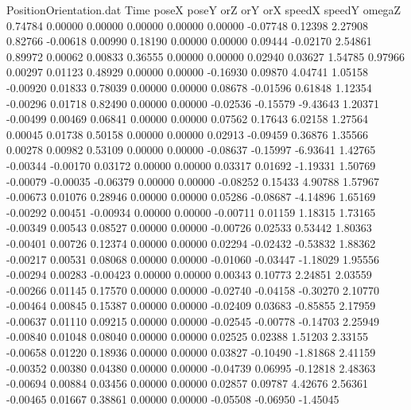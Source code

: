 \begin{filecontents}{PositionOrientation.dat}
Time poseX poseY orZ orY orX speedX speedY omegaZ
   0.74784    0.00000    0.00000     0.00000    0.00000    0.00000   -0.07748    0.12398    2.27908
   0.82766   -0.00618    0.00990     0.18190    0.00000    0.00000    0.09444   -0.02170    2.54861
   0.89972    0.00062    0.00833     0.36555    0.00000    0.00000    0.02940    0.03627    1.54785
   0.97966    0.00297    0.01123     0.48929    0.00000    0.00000   -0.16930    0.09870    4.04741
   1.05158   -0.00920    0.01833     0.78039    0.00000    0.00000    0.08678   -0.01596    0.61848
   1.12354   -0.00296    0.01718     0.82490    0.00000    0.00000   -0.02536   -0.15579   -9.43643
   1.20371   -0.00499    0.00469     0.06841    0.00000    0.00000    0.07562    0.17643    6.02158
   1.27564    0.00045    0.01738     0.50158    0.00000    0.00000    0.02913   -0.09459    0.36876
   1.35566    0.00278    0.00982     0.53109    0.00000    0.00000   -0.08637   -0.15997   -6.93641
   1.42765   -0.00344   -0.00170     0.03172    0.00000    0.00000    0.03317    0.01692   -1.19331
   1.50769   -0.00079   -0.00035    -0.06379    0.00000    0.00000   -0.08252    0.15433    4.90788
   1.57967   -0.00673    0.01076     0.28946    0.00000    0.00000    0.05286   -0.08687   -4.14896
   1.65169   -0.00292    0.00451    -0.00934    0.00000    0.00000   -0.00711    0.01159    1.18315
   1.73165   -0.00349    0.00543     0.08527    0.00000    0.00000   -0.00726    0.02533    0.53442
   1.80363   -0.00401    0.00726     0.12374    0.00000    0.00000    0.02294   -0.02432   -0.53832
   1.88362   -0.00217    0.00531     0.08068    0.00000    0.00000   -0.01060   -0.03447   -1.18029
   1.95556   -0.00294    0.00283    -0.00423    0.00000    0.00000    0.00343    0.10773    2.24851
   2.03559   -0.00266    0.01145     0.17570    0.00000    0.00000   -0.02740   -0.04158   -0.30270
   2.10770   -0.00464    0.00845     0.15387    0.00000    0.00000   -0.02409    0.03683   -0.85855
   2.17959   -0.00637    0.01110     0.09215    0.00000    0.00000   -0.02545   -0.00778   -0.14703
   2.25949   -0.00840    0.01048     0.08040    0.00000    0.00000    0.02525    0.02388    1.51203
   2.33155   -0.00658    0.01220     0.18936    0.00000    0.00000    0.03827   -0.10490   -1.81868
   2.41159   -0.00352    0.00380     0.04380    0.00000    0.00000   -0.04739    0.06995   -0.12818
   2.48363   -0.00694    0.00884     0.03456    0.00000    0.00000    0.02857    0.09787    4.42676
   2.56361   -0.00465    0.01667     0.38861    0.00000    0.00000   -0.05508   -0.06950   -1.45045

\end{filecontents}
